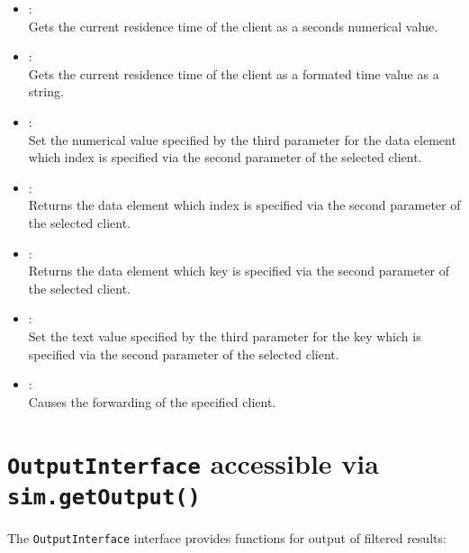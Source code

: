 \begin{itemize}
\item
{}:\\
Gets the current residence time of the client as a seconds numerical value.

\item
{}:\\
Gets the current residence time of the client as a formated time value as a string.

\item
{}:\\
Set the numerical value specified by the third parameter for the data element which index is specified via the second parameter of the selected client.

\item
{}:\\
Returns the data element which index is specified via the second parameter of the selected client.

\item
{}:\\
Returns the data element which key is specified via the second parameter of the selected client.

\item
{}:\\
Set the text value specified by the third parameter for the key which is specified via the second parameter of the selected client.

\item
{}:\\
Causes the forwarding of the specified client.

\end{itemize}


\chapter{\texttt{OutputInterface} accessible via \texttt{sim.getOutput()}}

The \texttt{OutputInterface} interface provides functions for output of filtered results:

